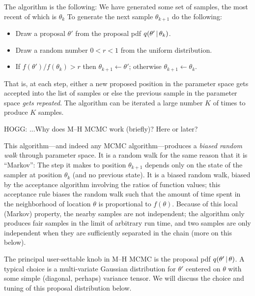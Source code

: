 \documentclass[12pt,twoside,pdftex]{article}
\newcommand{\pars}{\theta}
\begin{document}
The algorithm is the following:
We have generated some set of samples, the most recent of which is $\pars_k$
To generate the next sample $\pars_{k+1}$ do the following:
\begin{itemize}
\item Draw a proposal $\pars'$ from the proposal pdf $q(\pars'\given\pars_k)$.
\item Draw a random number $0<r<1$ from the uniform distribution.
\item If $f(\pars') / f(\pars_k) > r$ then $\pars_{k+1} \leftarrow \pars'$;
      otherwise $\pars_{k+1} \leftarrow \pars_k$.
\end{itemize}
That is, at each step, either a new proposed position in the parameter
  space gets accepted into the list of samples or else the previous sample
  in the parameter space \emph{gets repeated}.
The algorithm can be iterated a large number $K$ of times to produce $K$ samples.

HOGG: ...Why does M--H MCMC work (briefly)?  Here or later?

This algorithm---and indeed any MCMC algorithm---produces a
  \emph{biased random walk} through parameter space.
It is a random walk for the same reason that it is ``Markov'':
The step it makes to position $\pars_{k+1}$ depends only on the state
  of the sampler at position $\pars_k$ (and no previous state).
It is a biased random walk, biased by the acceptance algorithm
  involving the ratios of function values; this acceptance rule biases
  the random walk such that the amount of time spent in the neighborhood
  of location $\pars$ is proportional to $f(\pars)$.
Because of this local (Markov) property, the nearby samples are not
  independent; the algorithm only produces fair samples in the limit of
  arbitrary run time, and two samples are only independent when they are
  sufficiently separated in the chain (more on this below).

The principal user-settable knob in M--H MCMC is the proposal
  pdf $q(\pars'\given\pars)$.
A typical choice is a multi-variate Gaussian distribution for $\pars'$
  centered on $\pars$ with some simple (diagonal, perhaps) variance
  tensor.
We will discuss the choice and tuning of this proposal distribution
  below.
\end{document}
